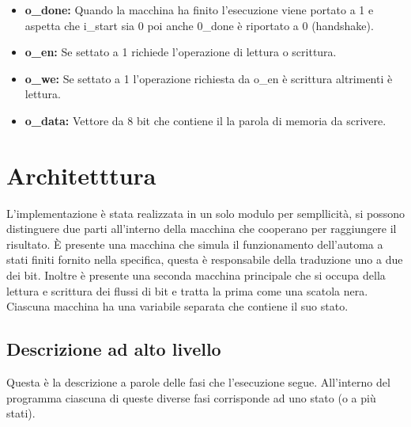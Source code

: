 \documentclass{article}
\begin{document}
\begin{itemize}
	\item \textbf{o\_done:} Quando la macchina ha finito l'esecuzione viene portato a 1 e aspetta che i\_start sia 0 poi anche 0\_done è riportato a 0 (handshake).
	\item \textbf{o\_en:} Se settato a 1 richiede l'operazione di lettura o scrittura.
	\item \textbf{o\_we:} Se settato a 1 l'operazione richiesta da o\_en è scrittura altrimenti è lettura.
	\item \textbf{o\_data:} Vettore da 8 bit che contiene il la parola di memoria da scrivere.
\end{itemize}





\section{Architetttura}
L'implementazione è stata realizzata in un solo modulo per sempllicità, si possono distinguere due parti all'interno della macchina che cooperano per raggiungere il risultato. È presente una macchina che simula il funzionamento dell'automa a stati finiti fornito nella specifica, questa è responsabile della traduzione uno a due dei bit. Inoltre è presente una seconda macchina principale che si occupa della lettura e scrittura dei flussi di bit e tratta la prima come una scatola nera. Ciascuna macchina ha una variabile separata che contiene il suo stato.

\subsection{Descrizione ad alto livello}
Questa è la descrizione a parole delle fasi che l'esecuzione segue. All'interno del programma ciascuna di queste diverse fasi corrisponde ad uno stato (o a più stati).
\end{document}
